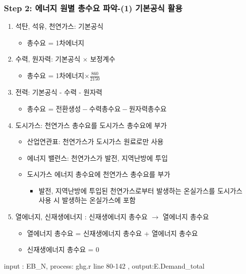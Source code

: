 \documentclass[10pt,compress,slidetop,%
			   hyperref={unicode},xcolor={svgnames},%
			   t]{beamer}
\begin{document}
\begin{frame}
	\frametitle{Step 2: 에너지 원별 총수요 파악-(1) 기본공식 활용}
\begin{enumerate}
\item{석탄, 석유, 천연가스: 기본공식}
\begin{itemize}
\item{총수요 = 1차에너지}
\end{itemize}
\smallskip

\item{수력, 원자력: 기본공식 $\times$ 보정계수}
\begin{itemize}
\item{총수요 = 1차에너지$\times\frac{860}{2150}$}
\end{itemize}
\smallskip

\item{전력: 기본공식 - 수력 - 원자력}
\begin{itemize}
\item{총수요 = $\mbox{전환생성}-\mbox{수력총수요}-\mbox{원자력총수요}$}
\end{itemize}
\smallskip

\item{도시가스: 천연가스 총수요를 도시가스 총수요에 부가}
\begin{itemize}
\item{산업연관표: 천연가스가 도시가스 원료로만 사용}
\item{에너지 밸런스: 천연가스가 발전, 지역난방에 투입}
\item{도시가스 에너지 총수요에 천연가스 총수요를 부가}
\begin{itemize}
\item{발전, 지역난방에 투입된 천연가스로부터 발생하는 온실가스를 도시가스 사용 시 발생하는 온실가스에 포함}
\end{itemize}
\end{itemize}
\smallskip
\item{열에너지, 신재생에너지 : 신재생에너지 총수요 $\rightarrow$ 열에너지 총수요}
\begin{itemize}
\item{열에너지 총수요 = 신재생에너지 총수요 + 열에너지 총수요}
\item{신재생에너지 총수요 = 0}
\end{itemize}
\end{enumerate} 	
input : EB\_N, process: ghg.r line 80-142	, output:E.Demand\_total	
\end{frame}
\end{document}
